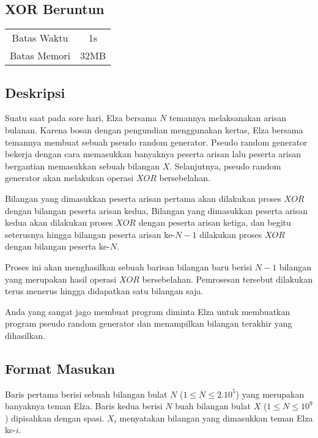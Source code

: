 \documentclass{article}
\begin{document}
\begin{center}
    \section*{XOR Beruntun} %

    \begin{tabular}{ | c c | }
        \hline
        Batas Waktu  & 1s \\    %
        Batas Memori & 32MB \\  %
        \hline
    \end{tabular}
\end{center}

\subsection*{Deskripsi}

Suatu saat pada sore hari, Elza bersama $N$ temannya melaksanakan arisan bulanan.
Karena bosan dengan pengundian menggunakan kertas, Elza bersama temannya membuat sebuah pseudo random generator.
Pseudo random generator bekerja dengan cara memasukkan banyaknya peserta arisan lalu peserta arisan bergantian memasukkan sebuah bilangan $X$.
Selanjutnya, pseudo random generator akan melakukan operasi $XOR$ bersebelahan.

Bilangan yang dimasukkan peserta arisan pertama akan dilakukan proses $XOR$ dengan bilangan peserta arisan kedua, 
Bilangan yang dimasukkan peserta arisan kedua akan dilakukan proses $XOR$ dengan peserta arisan ketiga, 
dan begitu seterusnya hingga bilangan peserta arisan ke-$N - 1$ dilakukan proses $XOR$ dengan bilangan peserta ke-$N$.

Proses ini akan menghasilkan sebuah barisan bilangan baru berisi $N - 1$ bilangan yang merupakan hasil operasi $XOR$ bersebelahan. 
Pemrosesan tersebut dilakukan terus menerus hingga didapatkan satu bilangan saja.

Anda yang sangat jago membuat program diminta Elza untuk membuatkan program pseudo random generator dan menampilkan bilangan terakhir yang dihasilkan.

\subsection*{Format Masukan}

Baris pertama berisi sebuah bilangan bulat $N$ ($1 \leq N \leq 2.10^5$) yang merupakan banyaknya teman Elza.
Baris kedua berisi $N$ buah bilangan bulat $X$ ($1 \leq N \leq 10^9$) dipisahkan dengan spasi. $X_{i}$ menyatakan bilangan yang dimasukkan teman Elza ke-$i$.
\end{document}
